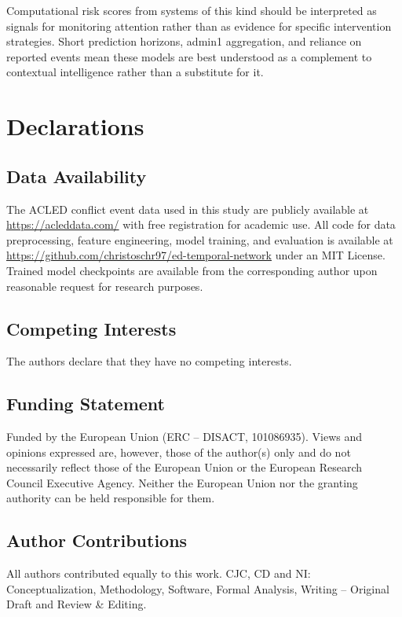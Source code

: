 \documentclass[pdflatex,sn-mathphys-num]{sn-jnl}%
\theoremstyle{thmstyleone}%
\theoremstyle{thmstyletwo}%
\theoremstyle{thmstylethree}%
\begin{document}
Computational risk scores from systems of this kind should be interpreted as signals for monitoring attention rather than as evidence for specific intervention strategies. Short prediction horizons, admin1 aggregation, and reliance on reported events mean these models are best understood as a complement to contextual intelligence rather than a substitute for it.

\section*{Declarations}

\subsection*{Data Availability}
The ACLED conflict event data used in this study are publicly available at \url{https://acleddata.com/} with free registration for academic use. All code for data preprocessing, feature engineering, model training, and evaluation is available at \url{https://github.com/christoschr97/ed-temporal-network} under an MIT License. Trained model checkpoints are available from the corresponding author upon reasonable request for research purposes.

\subsection*{Competing Interests}
The authors declare that they have no competing interests.

\subsection*{Funding Statement}
Funded by the European Union (ERC – DISACT, 101086935). Views and opinions expressed are, however, those of the author(s) only and do not necessarily reflect those of the European Union or the European Research Council Executive Agency. Neither the European Union nor the granting authority can be held responsible for them.

\subsection*{Author Contributions}
All authors contributed equally to this work. CJC, CD and NI: Conceptualization, Methodology, Software, Formal Analysis, Writing -- Original Draft and Review \& Editing.

\end{document}
